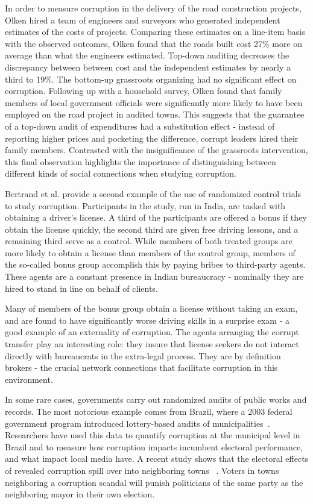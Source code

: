 In order to measure corruption in the delivery of the road construction projects, Olken hired a team of engineers and surveyors who generated independent estimates of the costs of projects. Comparing these estimates on a line-item basis with the observed outcomes, Olken found that the roads built cost 27\% more on average than what the engineers estimated. Top-down auditing decreases the discrepancy between between cost and the independent estimates by nearly a third to 19\%. The bottom-up grassroots organizing had no significant effect on corruption. Following up with a household survey, Olken found that family members of local government officials were significantly more likely to have been employed on the road project in audited towns. This suggests that the guarantee of a top-down audit of expenditures had a substitution effect - instead of reporting higher prices and pocketing the difference, corrupt leaders hired their family members. Contrasted with the insignificance of the grassroots intervention, this final observation highlights the importance of distinguishing between different kinds of social connections when studying corruption.

Bertrand et al. provide a second example of the use of randomized control trials~\cite{bertrand2007obtaining} to study corruption. Participants in the study, run in India, are tasked with obtaining a driver's license. A third of the participants are offered a bonus if they obtain the license quickly, the second third are given free driving lessons, and a remaining third serve as a control. While members of both treated groups are more likely to obtain a license than members of the control group, members of the so-called bonus group accomplish this by paying bribes to third-party agents. These agents are a constant presence in Indian bureaucracy - nominally they are hired to stand in line on behalf of clients. 

Many of members of the bonus group obtain a license without taking an exam, and are found to have significantly worse driving skills in a surprise exam - a good example of an externality of corruption. The agents arranging the corrupt transfer play an interesting role: they insure that license seekers do not interact directly with bureaucrats in the extra-legal process. They are by definition brokers - the crucial network connections that facilitate corruption in this environment.

In some rare cases, governments carry out randomized audits of public works and records. The most notorious example comes from Brazil, where a 2003 federal government program introduced lottery-based audits of municipalities~\cite{ferraz2008exposing,mucco2017anti}. Researchers have used this data to quantify corruption at the municipal level in Brazil and to measure how corruption impacts incumbent electoral performance, and what impact local media have. A recent study shows that the electoral effects of revealed corruption spill over into neighboring towns ~\cite{mucco2016learn}. Voters in towns neighboring a corruption scandal will punish politicians of the same party as the neighboring mayor in their own election.  


